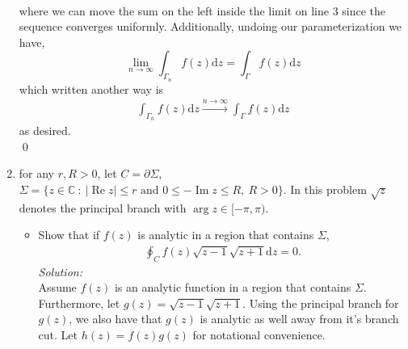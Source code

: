 \documentclass[10pt]{amsart}
\newcommand{\D}{\mathrm{d}}
\DeclareMathOperator{\real}{Re}
\DeclareMathOperator{\imag}{Im}
\theoremstyle{nonumberplain}
\begin{document}
\begin{enumerate}[label={\bf {\arabic*}:}]
\begin{align*}
\end{align*}
where we can move the sum on the left inside the limit on line 3 since the sequence converges uniformly.
Additionally, undoing our parameterization we have,
$$\lim_{n\rightarrow\infty} \int_{\Gamma_n}  f(z) \D z = \int_\Gamma  f(z) \D z$$
which written another way is
\begin{align*}
	\int_{\Gamma_n} f(z) \D z \overset{n \to \infty}{\longrightarrow}   \int_{\Gamma} f(z) \D z
\end{align*}
as desired. \\
\qed \\
\newpage

\item for any $r, R > 0$, let $C = \partial \Sigma$, $\Sigma = \{z \in \mathbb C ~:~
      |\real z | \leq r \text{ and } 0 \leq -\imag z \leq R, ~ R >
    0\}$.   In this problem $\sqrt{z}$ denotes the principal branch
    with $\arg z  \in [-\pi, \pi)$.
    \begin{itemize}
    \item Show that if $f(z)$ is analytic in a region that contains $\Sigma$,
      \begin{align*}
        \oint_C f(z) \sqrt{z-1} \sqrt{z+1} \D z = 0.
      \end{align*}
\textit{Solution:} \\
Assume $f(z)$ is an analytic function in a region that contains $\Sigma$.
Furthermore, let $g(z) = \sqrt{z-1} \sqrt{z+1}$.
Using the principal branch for $g(z)$, we also have that $g(z)$ is analytic as well away from it's branch cut.
Let $h(z) = f(z)g(z)$ for notational convenience.\\


\end{itemize}
\end{enumerate}
\end{document}
